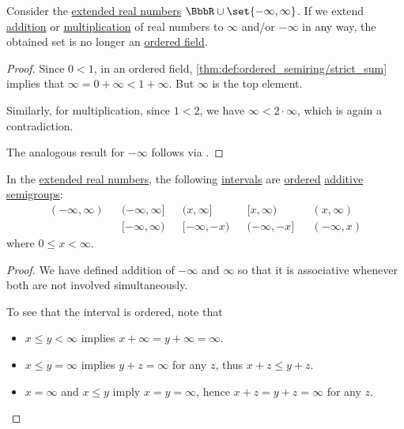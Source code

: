 \begin{proposition}\label{thm:extended_real_numbers_are_not_ordered_field}
  Consider the \hyperref[def:extended_real_numbers]{extended real numbers} \( \BbbR \cup \set{ -\infty, \infty } \). If we extend \hyperref[def:real_number_arithmetic/addition]{addition} or \hyperref[def:real_number_arithmetic/multiplication]{multiplication} of real numbers to \( \infty \) and/or \( -\infty \) in any way, the obtained set is no longer an \hyperref[def:ordered_semiring]{ordered field}.
\end{proposition}
\begin{proof}
  Since \( 0 < 1 \), in an ordered field, \cref{thm:def:ordered_semiring/strict_sum} implies that \( \infty = 0 + \infty < 1 + \infty \). But \( \infty \) is the top element.

  Similarly, for multiplication, since \( 1 < 2 \), we have \( \infty < 2 \cdot \infty \), which is again a contradiction.

  The analogous result for \( -\infty \) follows via .
\end{proof}

\begin{proposition}\label{thm:extended_real_semigroup}
  In the \hyperref[def:extended_real_numbers]{extended real numbers}, the following \hyperref[def:order_interval/closed]{intervals} are \hyperref[def:ordered_semigroup]{ordered} \hyperref[con:additive_semigroup]{additive semigroups}:
  \begin{align*}
    (-\infty, \infty) && (-\infty, \infty] && (x, \infty]   && [x, \infty)   && (x, \infty) \\
                      && [-\infty, \infty) && [-\infty, -x) && (-\infty, -x] && (-\infty, x)
  \end{align*}
  where \( 0 \leq x < \infty \).
\end{proposition}
\begin{proof}
  We have defined addition of \( -\infty \) and \( \infty \) so that it is associative whenever both are not involved simultaneously.

  To see that the interval is ordered, note that
  \begin{itemize}
    \item \( x \leq y < \infty \) implies \( x + \infty = y + \infty = \infty \).
    \item \( x \leq y = \infty \) implies \( y + z = \infty \) for any \( z \), thus \( x + z \leq y + z \).
    \item \( x = \infty \) and \( x \leq y \) imply \( x = y = \infty \), hence \( x + z = y + z = \infty \) for any \( z \).
  \end{itemize}
\end{proof}

